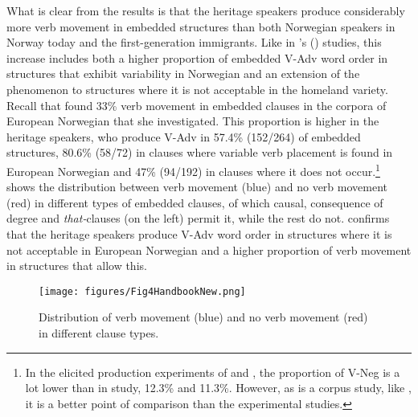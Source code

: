 \documentclass[output=paper]{langscibook}
\begin{document}
What is clear from the results is that the heritage speakers produce considerably more verb movement in embedded structures than both Norwegian speakers in Norway today and the first-generation immigrants. Like in \citeauthor{LarssonJohannessen2015Incomplete}’s (\citeyear{LarssonJohannessen2015Embedded,LarssonJohannessen2015Incomplete}) studies, this increase includes both a higher proportion of embedded V-Adv word order in structures that exhibit variability in Norwegian and an extension of the phenomenon to structures where it is not acceptable in the homeland variety. Recall that \citet{Ringstad2019} found 33\% verb movement in embedded clauses in the corpora of European Norwegian that she investigated. This proportion is higher in the heritage speakers, who produce V-Adv in 57.4\% (152/264) of embedded structures, 80.6\% (58/72) in clauses where variable verb placement is found in European Norwegian and 47\% (94/192) in clauses where it does not occur.\footnote{In the elicited production experiments of \citet{RingstadKush2021} and \citet{Westendorp2021}, the proportion of V-Neg is a lot lower than in  study, 12.3\% and 11.3\%. However, as \citet{Ringstad2019} is a corpus study, like \citet{JensbergEtAl2024}, it is a better point of comparison than the experimental studies.}  \citep{JensbergEtAl2024} shows the distribution between verb movement (blue) and no verb movement (red) in different types of embedded clauses, of which causal, consequence of degree and \textit{that-}clauses (on the left) permit it, while the rest do not.  confirms that the heritage speakers produce V-Adv word order in structures where it is not acceptable in European Norwegian and a higher proportion of verb movement in structures that allow this.

\begin{figure}
\texttt{[image: figures/Fig4HandbookNew.png]}
\caption{Distribution of verb movement (blue) and no verb movement (red) in different clause types.}
\label{fig:anderssen:3}
\end{figure}
\end{document}
